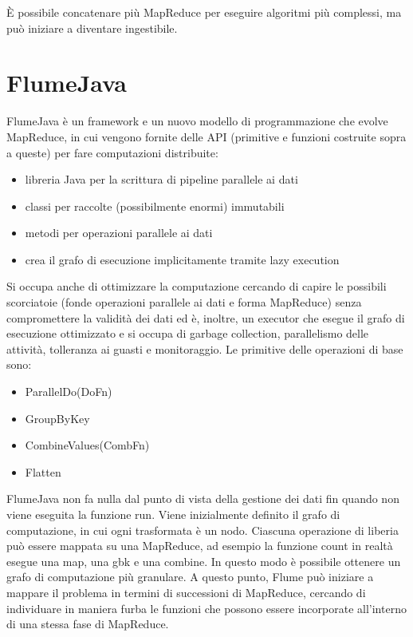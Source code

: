 È possibile concatenare più MapReduce per eseguire algoritmi più complessi, ma può iniziare a diventare ingestibile.

\section{FlumeJava}

FlumeJava è un framework e un nuovo modello di programmazione che evolve MapReduce, in cui vengono fornite delle API (primitive e funzioni costruite sopra a queste) per fare computazioni distribuite:

\begin{itemize}
    \item libreria Java per la scrittura di pipeline parallele ai dati
    \item classi per raccolte (possibilmente enormi) immutabili
    \item metodi per operazioni parallele ai dati
    \item crea il grafo di esecuzione implicitamente tramite lazy execution
\end{itemize}

Si occupa anche di ottimizzare la computazione cercando di capire le possibili scorciatoie (fonde operazioni parallele ai dati e forma MapReduce) senza compromettere la validità dei dati ed è, inoltre, un executor che esegue il grafo di esecuzione ottimizzato e si occupa di garbage collection, parallelismo delle attività, tolleranza ai guasti e monitoraggio. Le primitive delle operazioni di base sono:

\begin{itemize}
    \item ParallelDo(DoFn)
    \item GroupByKey
    \item CombineValues(CombFn)
    \item Flatten
\end{itemize}

FlumeJava non fa nulla dal punto di vista della gestione dei dati fin quando non viene eseguita la funzione run. Viene inizialmente definito il grafo di computazione, in cui ogni trasformata è un nodo. Ciascuna operazione di liberia può essere mappata su una MapReduce, ad esempio la funzione count in realtà esegue una map, una gbk e una combine. In questo modo è possibile ottenere un grafo di computazione più granulare. A questo punto, Flume può iniziare a mappare il problema in termini di successioni di MapReduce, cercando di individuare in maniera furba le funzioni che possono essere incorporate all'interno di una stessa fase di MapReduce.

